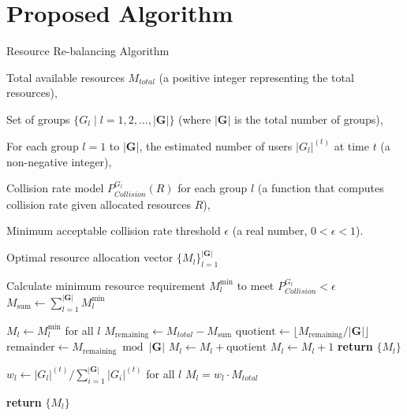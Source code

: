 \chapter{Proposed Algorithm}
\label{chap:algorithm}
\begin{algorithm}[H]
    \caption{Resource Re-balancing Algorithm}
    \label{alg:rebalancing_algorithm}
    \begin{algorithmic}[1]
        \REQUIRE{}

        Total available resources $M_{total}$ (a positive integer representing the total resources),

        Set of groups $\{G_l \mid l = 1, 2, \dots, |\textbf{G}|\}$ (where $|\textbf{G}|$ is the total number of groups),

        For each group $l = 1$ to $|\textbf{G}|$, the estimated number of users $|G_l|^{(t)}$ at time $t$ (a non-negative integer),

        Collision rate model $P_{Collision}^{G_l}(R)$ for each group $l$ (a function that computes collision rate given allocated resources $R$),

        Minimum acceptable collision rate threshold $\epsilon$ (a real number, $0 < \epsilon < 1$).


        \ENSURE
        Optimal resource allocation vector $\{ M_{l} \}_{l=1}^{|\textbf{G}|}$

        \STATE {}
        \STATE Calculate minimum resource requirement $M_{l}^{\min}$ to meet $P_{Collision}^{G_{l}} < \epsilon$
        \ENDFOR
        \STATE $M_{\mathrm{sum}} \gets \sum_{l=1}^{|\textbf{G}|} M_{l}^{\min}$

        \STATE $M_{l} \gets M_{l}^{\min}$ for all $l$ 
        \STATE $M_{\mathrm{remaining}} \gets M_{total} - M_{\mathrm{sum}}$
        \STATE $\text{quotient} \gets \lfloor M_{\mathrm{remaining}} / |\textbf{G}| \rfloor$ 
        \STATE $\text{remainder} \gets M_{\mathrm{remaining}} \bmod |\textbf{G}|$ 
        \STATE $M_{l} \gets M_{l} + \text{quotient}$ 
        \STATE $M_{l} \gets M_{l} + 1$ 
        \ENDIF
        \ENDFOR
        \STATE \textbf{return} $\{M_{l}\}$
        \ENDIF

        \STATE {}
        \STATE $w_l \gets |G_l|^{(t)} / \sum_{i=1}^{|\textbf{G}|} |G_i|^{(t)}$ for all $l$ 
        \STATE $M_{l} = w_l \cdot M_{total}$ 
        \ENDFOR

        \STATE \textbf{return} $\{M_{l}\}$
    \end{algorithmic}
\end{algorithm}



